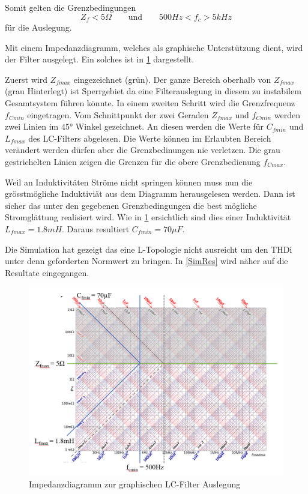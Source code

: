 Somit gelten die Grenzbedingungen
\[
	Z_f < 5\Omega \qquad \text{und} \qquad 500Hz < f_c > 5kHz
\]
für die Auslegung.
 
Mit einem Impedanzdiagramm, welches als graphische Unterstützung dient, wird der Filter ausgelegt.
Ein solches ist in \ref{fig:ImpChart} dargestellt.

Zuerst wird $Z_{fmax}$ eingezeichnet (grün). 
Der ganze Bereich oberhalb von $Z_{fmax}$ (grau Hinterlegt) ist Sperrgebiet da eine Filterauslegung in diesem zu instabilem Gesamtsystem führen könnte. 
In einem zweiten Schritt wird die Grenzfrequenz $f_{Cmin}$ eingetragen.
Vom Schnittpunkt der zwei Geraden $Z_{fmax}$ und $f_{Cmin}$ werden zwei Linien im $45°$ Winkel gezeichnet. 
An diesen werden die Werte für $C_{fmin}$ und $L_{fmax}$ des LC-Filters abgelesen. 
Die Werte können im Erlaubten Bereich verändert werden dürfen aber die Grenzbedinungen nie verletzen.
Die grau gestrichelten Linien zeigen die Grenzen für die obere Grenzbedienung $f_{Cmax}$. 

Weil an Induktivitäten Ströme nicht springen können muss nun die grösstmögliche Induktiviät aus dem Diagramm herausgelesen werden.
Dann ist sicher das unter den gegebenen Grenzbedingungen die best mögliche Stromglättung realisiert wird.
Wie in \ref*{fig:ImpChart} ersichtlich sind dies einer Induktivität $L_{fmax} = 1.8mH$.
Daraus resultiert $C_{fmin} = 70 \mu F$.

Die Simulation hat gezeigt das eine L-Topologie nicht ausreicht um den THDi unter denn geforderten Normwert zu bringen.
In \ref{SimRes} wird näher auf die Resultate eingegangen.
\begin{figure}[h]
	\begin{center}
		\includegraphics[width=\linewidth]{images/ImpChart}
		\caption{Impedanzdiagramm zur graphischen LC-Filter Auslegung}
		\label{fig:ImpChart}
	\end{center} 
\end{figure}


